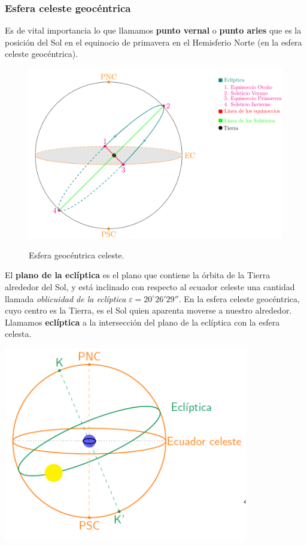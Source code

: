 \subsubsection{Esfera celeste geocéntrica}

Es de vital importancia lo que llamamos \textbf{punto vernal} o \textbf{punto aries} que es la posición del Sol en el equinocio de primavera en el Hemisferio Norte (en la esfera celeste geocéntrica).

\begin{figure}[h!] \centering
	\includegraphics[width=0.6\linewidth]{Cuerpo/Ch_01/Geocentricas.png}
	\label{Fig:01-orto}
	\caption{Esfera geocéntrica celeste.}
\end{figure}


\begin{minipage}{0.6\textwidth}
	El \textbf{plano de la eclíptica} es el plano que contiene la órbita de la Tierra alrededor del Sol, y está inclinado con respecto al ecuador celeste una cantidad llamada \textit{oblicuidad de la eclíptica} $\varepsilon=20^\circ 26'29''$. En la esfera celeste geocéntrica, cuyo centro es la Tierra, es el Sol quien aparenta moverse a nuestro alrededor. Llamamos \textbf{eclíptica} a la intersección del plano de la eclíptica con la esfera celesta. %
\end{minipage}	\hfill
\begin{minipage}{0.38\textwidth} \centering
	\includegraphics[width=0.8\textwidth]{Cuerpo/Imagenes/01_Ecliptica.png}
\end{minipage}




